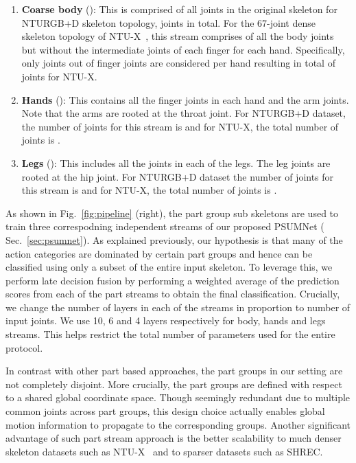 \documentclass[runningheads]{llncs}
\begin{document}
\begin{enumerate}
    \item \textbf{Coarse body} (): This is comprised of all joints in the original skeleton for NTURGB+D skeleton topology,  joints in total. For the 67-joint dense skeleton topology of NTU-X~\cite{trivedi2021ntux}, this stream comprises of all the body joints but without the intermediate joints of each finger for each hand. Specifically, only  joints out of  finger joints are considered per hand resulting in total of  joints for NTU-X.
    \item \textbf{Hands} (): This contains all the finger joints in each hand and the arm joints. Note that the arms are rooted at the throat joint. For NTURGB+D dataset, the number of joints for this stream is  and for NTU-X, the total number of joints is . 
    \item \textbf{Legs} (): This includes all the joints in each of the legs. The leg joints are rooted at the hip joint. For NTURGB+D dataset the number of joints for this stream is  and for NTU-X, the total number of joints is .
\end{enumerate}

As shown in Fig.~\ref{fig:pipeline} (right), the part group sub skeletons are used to train three correspodning independent streams of our proposed PSUMNet ( Sec.~\ref{sec:psumnet}). As explained previously, our hypothesis is that many of the action categories are dominated by certain part groups and hence can be classified using only a subset of the entire input skeleton. To leverage this, we perform late decision fusion by performing a weighted average of the prediction scores from each of the part streams to obtain  the final classification. Crucially, we change the number of layers in each of the streams in proportion to number of input joints. We use 10, 6 and 4 layers respectively for body, hands and legs streams. This helps restrict the total number of parameters used for the entire protocol. 

In contrast with other part based approaches, the part groups in our setting are not completely disjoint. More crucially, the part groups are defined with respect to a shared global coordinate space. Though seemingly redundant due to multiple common joints across part groups, this design choice actually enables global motion information to propagate to the corresponding groups. Another significant advantage of such part stream approach is the better scalability to much denser skeleton datasets such as NTU-X~\cite{trivedi2021ntux} and to sparser  datasets such as SHREC\cite{de20173d}.
\end{document}
